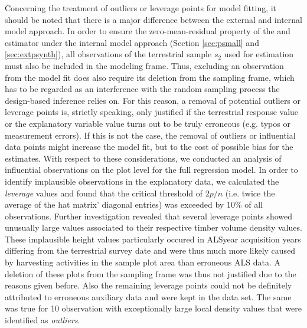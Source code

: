 

Concerning the treatment of outliers or leverage points for model fitting, it should be noted that there is a major difference between the external and internal model approach. In order to ensure the zero-mean-residual property of the \psmall{} and \extpsynth{} estimator under the internal model approach (Section \ref{sec:psmall} and \ref{sec:extpsynth}), all observations of the terrestrial sample $s_2$ used for estimation must also be included in the modeling frame. Thus, excluding an observation from the model fit does also require its deletion from the sampling frame, which has to be regarded as an interference with the random sampling process the design-based inference relies on. For this reason, a removal of potential outliers or leverage points is, strictly speaking, only justified if the terrestrial response value or the explanatory variable value turns out to be truly erroneous (e.g. typos or measurement errors). If this is not the case, the removal of outliers or influential data points might increase the model fit, but to the cost of possible bias for the estimates. With respect to these considerations, we conducted an analysis of influential observations \citep[pp. 160--167]{fahrmeir2013} on the plot level for the full regression model. In order to identify implausible observations in the explanatory data, we calculated the \textit{leverage} values and found that the critical threshold of $2p/n$ (i.e. twice the average of the hat matrix' diagonal entries) was exceeded by 10\% of all observations. Further investigation revealed that several leverage points showed unusually large \meanheight{} values associated to their respective timber volume density values. These implausible height values particularly occured in ALSyear acquisition years differing from the terrestrial survey date and were thus much more likely caused by harvesting activities in the sample plot area than erroneous ALS data. A deletion of these plots from the sampling frame was thus not justified due to the reasons given before. Also the remaining leverage points could not be definitely attributed to erroneous auxiliary data and were kept in the data set. The same was true for 10 observation with exceptionally large local density values that were identified as \textit{outliers}.

\vspace{-0.7cm}


\newpage
